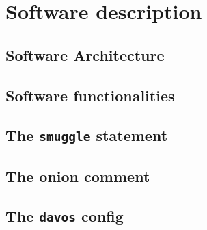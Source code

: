\documentclass[preprint,12pt, a4paper]{elsarticle}
\begin{document}






\section{Software description}


\subsection{Software Architecture}


\subsection{Software functionalities}\label{sec:functionalities}

\subsection{The \texttt{smuggle} statement}

\subsection{The onion comment}

\subsection{The \texttt{davos} config}
\end{document}

